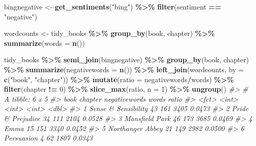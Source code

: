 \documentclass[
]{book}
\newenvironment{Shaded}{\begin{snugshade}}{\end{snugshade}}
\newcommand{\AttributeTok}[1]{\textcolor[rgb]{0.13,0.29,0.53}{#1}}
\newcommand{\CommentTok}[1]{\textcolor[rgb]{0.56,0.35,0.01}{\textit{#1}}}
\newcommand{\DecValTok}[1]{\textcolor[rgb]{0.00,0.00,0.81}{#1}}
\newcommand{\FunctionTok}[1]{\textcolor[rgb]{0.13,0.29,0.53}{\textbf{#1}}}
\newcommand{\NormalTok}[1]{#1}
\newcommand{\OtherTok}[1]{\textcolor[rgb]{0.56,0.35,0.01}{#1}}
\newcommand{\SpecialCharTok}[1]{\textcolor[rgb]{0.81,0.36,0.00}{\textbf{#1}}}
\newcommand{\StringTok}[1]{\textcolor[rgb]{0.31,0.60,0.02}{#1}}
\begin{document}
\begin{Shaded}
\begin{Highlighting}[]
\NormalTok{bingnegative }\OtherTok{\textless{}{-}} \FunctionTok{get\_sentiments}\NormalTok{(}\StringTok{"bing"}\NormalTok{) }\SpecialCharTok{\%\textgreater{}\%} 
  \FunctionTok{filter}\NormalTok{(sentiment }\SpecialCharTok{==} \StringTok{"negative"}\NormalTok{)}

\NormalTok{wordcounts }\OtherTok{\textless{}{-}}\NormalTok{ tidy\_books }\SpecialCharTok{\%\textgreater{}\%}
  \FunctionTok{group\_by}\NormalTok{(book, chapter) }\SpecialCharTok{\%\textgreater{}\%}
  \FunctionTok{summarize}\NormalTok{(}\AttributeTok{words =} \FunctionTok{n}\NormalTok{())}

\NormalTok{tidy\_books }\SpecialCharTok{\%\textgreater{}\%}
  \FunctionTok{semi\_join}\NormalTok{(bingnegative) }\SpecialCharTok{\%\textgreater{}\%}
  \FunctionTok{group\_by}\NormalTok{(book, chapter) }\SpecialCharTok{\%\textgreater{}\%}
  \FunctionTok{summarize}\NormalTok{(}\AttributeTok{negativewords =} \FunctionTok{n}\NormalTok{()) }\SpecialCharTok{\%\textgreater{}\%}
  \FunctionTok{left\_join}\NormalTok{(wordcounts, }\AttributeTok{by =} \FunctionTok{c}\NormalTok{(}\StringTok{"book"}\NormalTok{, }\StringTok{"chapter"}\NormalTok{)) }\SpecialCharTok{\%\textgreater{}\%}
  \FunctionTok{mutate}\NormalTok{(}\AttributeTok{ratio =}\NormalTok{ negativewords}\SpecialCharTok{/}\NormalTok{words) }\SpecialCharTok{\%\textgreater{}\%}
  \FunctionTok{filter}\NormalTok{(chapter }\SpecialCharTok{!=} \DecValTok{0}\NormalTok{) }\SpecialCharTok{\%\textgreater{}\%}
  \FunctionTok{slice\_max}\NormalTok{(ratio, }\AttributeTok{n =} \DecValTok{1}\NormalTok{) }\SpecialCharTok{\%\textgreater{}\%} 
  \FunctionTok{ungroup}\NormalTok{()}
\CommentTok{\#\textgreater{} \# A tibble: 6 x 5}
\CommentTok{\#\textgreater{}   book                chapter negativewords words  ratio}
\CommentTok{\#\textgreater{}   \textless{}fct\textgreater{}                 \textless{}int\textgreater{}         \textless{}int\textgreater{} \textless{}int\textgreater{}  \textless{}dbl\textgreater{}}
\CommentTok{\#\textgreater{} 1 Sense \& Sensibility      43           161  3405 0.0473}
\CommentTok{\#\textgreater{} 2 Pride \& Prejudice        34           111  2104 0.0528}
\CommentTok{\#\textgreater{} 3 Mansfield Park           46           173  3685 0.0469}
\CommentTok{\#\textgreater{} 4 Emma                     15           151  3340 0.0452}
\CommentTok{\#\textgreater{} 5 Northanger Abbey         21           149  2982 0.0500}
\CommentTok{\#\textgreater{} 6 Persuasion                4            62  1807 0.0343}
\end{Highlighting}
\end{Shaded}
\end{document}
